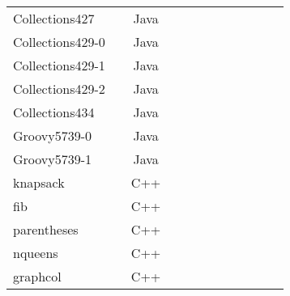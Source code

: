 \begin{table*}
\begin{tabular}{lcccc|cccc|ccc}
Collections427    &    & Java  &  &              &    &                                 &                   &                           &                        &   &        \\
Collections429-0    &    & Java  &  &              &    &                                 &                   &                           &                        &   &        \\
Collections429-1    &    & Java  &  &              &    &                                 &                   &                           &                        &   &        \\
Collections429-2    &    & Java  &  &              &    &                                 &                   &                           &                        &   &        \\
Collections434    &    & Java  &  &              &    &                                 &                   &                           &                        &   &        \\
\midrule
Groovy5739-0      &    & Java  &  &              &    &                                 &                   &                           &                        &   &        \\
Groovy5739-1      &    & Java  &  &              &    &                                 &                   &                           &                        &   &        \\
\midrule
\midrule
knapsack      &    & C++  &  &              &    &                                 &                   &                           &                        &   &        \\
fib      &    & C++  &  &              &    &                                 &                   &                           &                        &   &        \\
parentheses      &    & C++  &  &              &    &                                 &                   &                           &                        &   &        \\
nqueens      &    & C++  &  &              &    &                                 &                   &                           &                        &   &        \\
graphcol      &    & C++  &  &              &    &                                 &                   &                           &                        &   &        \\

\end{tabular}
\end{table*}
